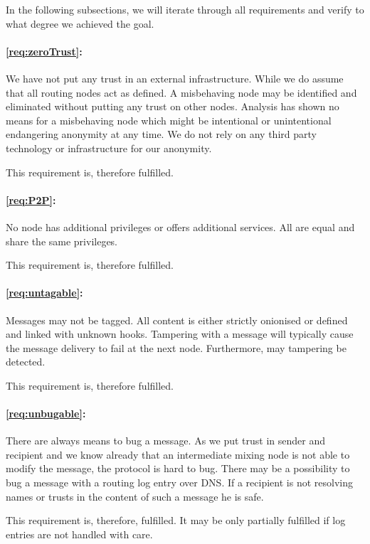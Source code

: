 In the following subsections, we will iterate through all requirements and verify to what degree we achieved the goal.

\paragraph*{\ref{req:zeroTrust}:} 
We have not put any trust in an external infrastructure. While we do assume that all routing nodes act as defined. A misbehaving node may be identified and eliminated without putting any trust on other nodes. Analysis has shown no means for a misbehaving node which might be intentional or unintentional endangering anonymity at any time. We do not rely on any third party technology or infrastructure for our anonymity. 

This requirement is, therefore fulfilled.

\paragraph*{\ref{req:P2P}:} 
No node has additional privileges or offers additional services. All are equal and share the same privileges.

This requirement is, therefore fulfilled.

\paragraph*{\ref{req:untagable}:} 
Messages may not be tagged. All content is either strictly onionised or defined and linked with unknown hooks. Tampering with a message will typically cause the message delivery to fail at the next node. Furthermore, may tampering be detected.

This requirement is, therefore fulfilled.

\paragraph*{\ref{req:unbugable}:} 
There are always means to bug a message. As we put trust in sender and recipient and we know already that an intermediate mixing node is not able to modify the message, the protocol is hard to bug. There may be a possibility to bug a message with a routing log entry over DNS. If a recipient is not resolving names or trusts in the content of such a message he is safe.

This requirement is, therefore, fulfilled. It may be only partially fulfilled if log entries are not handled with care.

